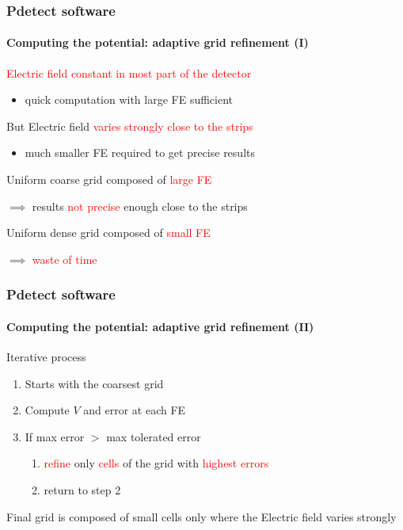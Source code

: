 \documentclass[14pt]{beamer}
\begin{document}
\begin{frame}
  \frametitle{Pdetect software}
  \framesubtitle{Computing the potential: adaptive grid refinement (I)}

  \textcolor{red}{Electric field constant in most part of the detector}
  \begin{itemize}
    \item quick computation with large FE sufficient
  \end{itemize}

  But Electric field \textcolor{red}{varies strongly close to the strips}
  \begin{itemize}
    \item much smaller FE required to get precise results\newline
  \end{itemize}

  Uniform coarse grid composed of \textcolor{red}{large FE}

  $\implies$ results
  \textcolor{red}{not precise} enough close to the strips
  \newline

  Uniform dense grid composed of \textcolor{red}{small FE}

   $\implies$ \textcolor{red}{waste of time}

\end{frame}

\begin{frame}
  \frametitle{Pdetect software}
  \framesubtitle{Computing the potential: adaptive grid refinement (II)}

  Iterative process

  \begin{enumerate}
    \item Starts with the coarsest grid
    \item Compute $V$ and error at each FE
    \item If max error $>$ max tolerated error
    \begin{enumerate}
      \item \textcolor{red}{refine} only \textcolor{red}{cells} of the grid with \textcolor{red}{highest errors}
      \item return to step 2
    \end{enumerate}
  \end{enumerate}

  Final grid is composed of small cells only where the Electric field varies
  strongly
\end{frame}
\end{document}
